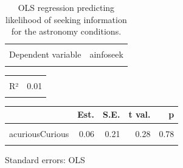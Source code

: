 \documentclass[
  letterpaper,
  DIV=11,
  numbers=noendperiod]{scrartcl}
\begin{document}
\hypertarget{tbl-ainfoseek}{}
\begin{table}[!h]
\caption{\label{tbl-ainfoseek}OLS regression predicting likelihood of seeking information for the
astronomy conditions. }\tabularnewline

\centering
\begin{tabular}{lr}
\toprule
\cellcolor{gray!10}{Observations} & \cellcolor{gray!10}{235}\\
Dependent variable & ainfoseek\\
\cellcolor{gray!10}{Type} & \cellcolor{gray!10}{OLS linear regression}\\
\bottomrule
\end{tabular}
\end{table} \begin{table}[!h]
\centering
\begin{tabular}{lr}
\toprule
\cellcolor{gray!10}{F(2,232)} & \cellcolor{gray!10}{1.31}\\
R² & 0.01\\
\cellcolor{gray!10}{Adj. R²} & \cellcolor{gray!10}{0.00}\\
\bottomrule
\end{tabular}
\end{table} \begin{table}[!h]
\centering
\begin{threeparttable}
\begin{tabular}{lrrrr}
\toprule
  & Est. & S.E. & t val. & p\\
\midrule
\cellcolor{gray!10}{(Intercept)} & \cellcolor{gray!10}{3.24} & \cellcolor{gray!10}{0.18} & \cellcolor{gray!10}{18.33} & \cellcolor{gray!10}{0.00}\\
acuriousCurious & 0.06 & 0.21 & 0.28 & 0.78\\
\cellcolor{gray!10}{aresoResolution} & \cellcolor{gray!10}{-0.33} & \cellcolor{gray!10}{0.21} & \cellcolor{gray!10}{-1.60} & \cellcolor{gray!10}{0.11}\\
\bottomrule
\end{tabular}
\begin{tablenotes}
\item Standard errors: OLS
\end{tablenotes}
\end{threeparttable}
\end{table}
\end{document}
